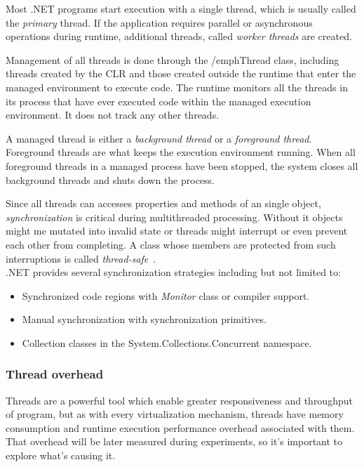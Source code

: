 Most .NET programs start execution with a single thread, which is usually called the \emph{primary} thread. If the application requires parallel or asynchronous operations during runtime, additional threads, called \emph{worker threads} are created.

Management of all threads is done through the /emph{Thread} class, including threads created by the CLR and those created outside the runtime that enter the managed environment to execute code. The runtime monitors all the threads in its process that have ever executed code within the managed execution environment. It does not track any other threads.
 
A managed thread is either a \emph{background thread} or a \emph{foreground thread}. Foreground threads are what keeps the execution environment running. When all foreground threads in a managed process have been stopped, the system closes all background threads and shuts down the process. 

Since all threads can accesses properties and methods of an single object, \emph{synchronization} is critical during multithreaded processing. Without it objects might me mutated into invalid state or threads might interrupt or even prevent each other from completing. A class whose members are protected from such interruptions is called \emph{thread-safe}~\cite{ManagedThreading}.\\ 

.NET provides several synchronization strategies including but not limited to:
\begin{itemize}
	\item Synchronized code regions with \emph{Monitor} class or compiler support.
	\item Manual synchronization with synchronization primitives.
	\item Collection classes in the System.Collections.Concurrent namespace. 
\end{itemize}

\subsubsection{Thread overhead}
Threads are a powerful tool which enable greater responsiveness and throughput of program, but as with every virtualization mechanism, threads have memory consumption and runtime execution performance overhead associated with them. That overhead will be later measured during experiments, so it's important to explore what's causing it. \\

